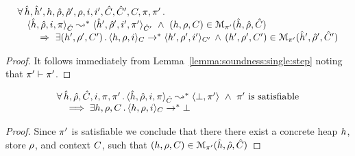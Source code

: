 \begin{temax}
$$
\begin{array}{l}
\forall \, \sheap, \sheap', \heap, \sstore, \sstore', \store, i, i', \sctx, \sctx', \ctx, \pc, \pc' \, . \,  \\  
\quad \symbtranstrans{\sheap, \sstore, i, \pc}{\sheap', \sstore', i', \pc'}[\sctx][\sctx'] 
   \ \wedge \ 
      (\heap, \store, \ctx) \in \smodels{\sheap, \sstore, \sctx}{\pc'} \\ \quad \quad
      	 \ \Rightarrow \ \exists (\heap', \store', \ctx') \, . \, 
	 	 \semtranstrans{\heap, \store, i}{\heap', \store', i'}[\ctx][\ctx']
		\, \wedge \, 
		(\heap', \store', \ctx') \in \smodels{\sheap', \sstore', \sctx'}{\pc'}  
\end{array}
$$
\end{temax}
\begin{proof}
It follows immediately from Lemma~\ref{lemma:soundness:single:step} noting that $\pc' \vdash \pc'$. 
\end{proof}


\begin{cormax}
$$
\begin{array}{l}
\forall \, \sheap, \sstore, \sctx, i, \pc, \pc' \, . \,  
 \symbtranstranserr{\sheap, \sstore, i, \pc}{\sctx}{\pc'}  \ \wedge \  \pc' \text{ is satisfiable} \\ 
   \quad \implies 
     \exists \heap, \store, \ctx \, . \, \semtranstranserr{\heap, \store, i}[\ctx]
\end{array}
$$
\end{cormax}
\begin{proof}
Since $\pc'$ is satisfiable we conclude that there there exist a concrete heap $\heap$, 
store $\store$, and context $\ctx$, such that $(\heap, \store, \ctx) \in \smodels{\sheap, \sstore, \sctx}{\pc'}$ 
\end{proof}


